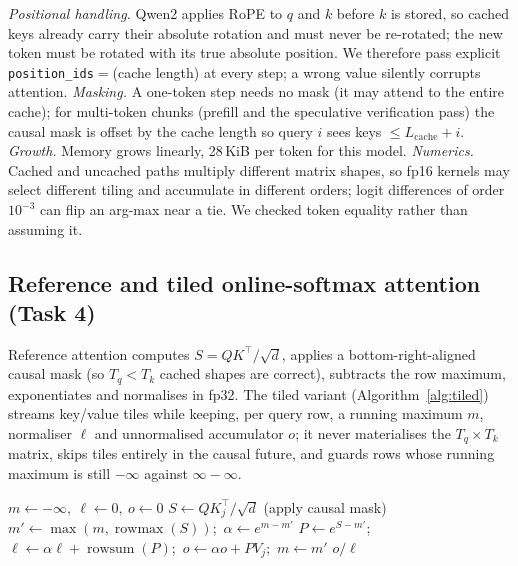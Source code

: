 \documentclass[conference]{IEEEtran}
\begin{document}
\emph{Positional handling.} Qwen2 applies RoPE to $q$ and $k$ before $k$ is stored, so cached keys already carry their absolute rotation and must never be re-rotated; the new token must be rotated with its true absolute position. We therefore pass explicit \texttt{position\_ids}$=$(cache length) at every step; a wrong value silently corrupts attention. \emph{Masking.} A one-token step needs no mask (it may attend to the entire cache); for multi-token chunks (prefill and the speculative verification pass) the causal mask is offset by the cache length so query $i$ sees keys $\le L_{\text{cache}}+i$. \emph{Growth.} Memory grows linearly, 28\,KiB per token for this model. \emph{Numerics.} Cached and uncached paths multiply different matrix shapes, so fp16 kernels may select different tiling and accumulate in different orders; logit differences of order $10^{-3}$ can flip an arg-max near a tie. We checked token equality rather than assuming it.

\subsection{Reference and tiled online-softmax attention (Task 4)}
Reference attention computes $S=QK^\top/\sqrt d$, applies a bottom-right-aligned causal mask (so $T_q<T_k$ cached shapes are correct), subtracts the row maximum, exponentiates and normalises in fp32. The tiled variant (Algorithm~\ref{alg:tiled}) streams key/value tiles while keeping, per query row, a running maximum $m$, normaliser $\ell$ and unnormalised accumulator $o$; it never materialises the $T_q\times T_k$ matrix, skips tiles entirely in the causal future, and guards rows whose running maximum is still $-\infty$ against $\infty-\infty$.

\begin{algorithm}[t]
\caption{Tiled attention with online softmax (per query tile)}\label{alg:tiled}
\begin{algorithmic}[1]
\State $m\gets-\infty,\ \ell\gets0,\ o\gets0$
  \State $S\gets Q K_j^\top/\sqrt d$ (apply causal mask)
  \State $m'\gets\max(m,\operatorname{rowmax}(S))$;\ $\alpha\gets e^{m-m'}$
  \State $P\gets e^{S-m'}$;\ $\ell\gets\alpha\ell+\operatorname{rowsum}(P)$;\ $o\gets\alpha o+PV_j$;\ $m\gets m'$
\EndFor
\State \Return $o/\ell$
\end{algorithmic}
\end{algorithm}
\end{document}

